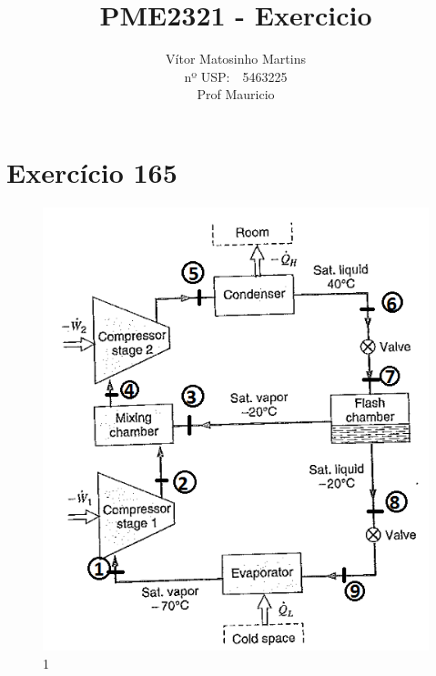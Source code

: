 \documentclass[a4paper, 12pt]{article}
\title{PME2321 - Exercicio}
\author{Vítor Matosinho Martins \\ 
nº USP:\ \ 5463225 \\
Prof Mauricio}
\begin{document}
\maketitle

\section{Exercício 165}
\begin{figure}[h]
\begin{center}
\includegraphics[scale=0.7]{./fig/1.png}
\caption{\label{fig:1}1} 
\end{center}
\end{figure}

\pagebreak
\end{document}
